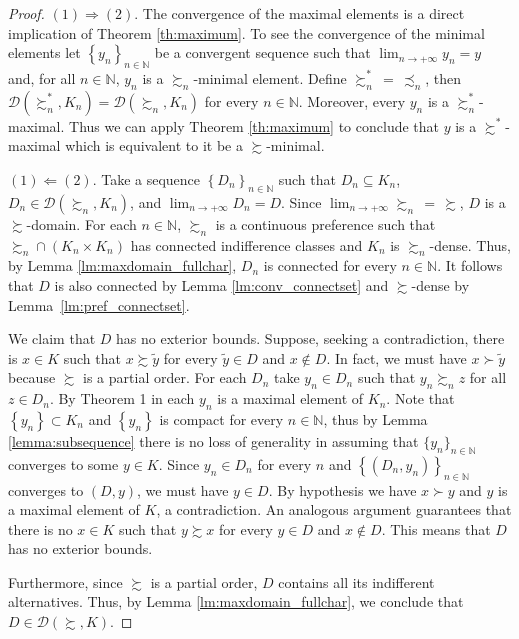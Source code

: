 \documentclass[12pt, oneside]{amsart}
\theoremstyle{definition}
\begin{document}
\begin{proof}
$(1) \Rightarrow (2)$. The convergence of the maximal elements is a direct implication of Theorem \ref{th:maximum}. To see the convergence of the minimal elements let $\left\{y_n\right\}_{n \in \mathbb{N}}$ be a convergent sequence such that $\lim_{n \to + \infty} y_n = y$ and, for all $n \in \mathbb{N}$, $y_n$ is a $\succsim_n$-minimal element. Define $\succsim^*_n \hspace{2pt} = \hspace{2pt}\precsim_n$, then $\mathcal{D}\left(\succsim^*_n, K_n\right) = \mathcal{D}\left(\succsim_n, K_n\right)$ for every $n \in \mathbb{N}$. Moreover, every $y_n$ is a $\succsim^*_n$-maximal. Thus we can apply Theorem \ref{th:maximum} to conclude that $y$ is a $\succsim^*$-maximal which is equivalent to it be a $\succsim$-minimal.
	
$(1) \Leftarrow (2)$. Take a sequence $\left\{D_n\right\}_{n \in \mathbb{N}}$ such that $D_n \subseteq K_n$, $D_n \in \mathcal{D}\left(\succsim_n, K_n\right)$, and $\lim_{n \to +\infty} D_n = D$. Since $\lim_{n \to +\infty} \succsim_n \hspace{2pt} = \hspace{2pt} \succsim$, $D$ is a $\succsim$-domain. For each $n \in \mathbb{N}$, $\succsim_n$ is a continuous preference such that $\succsim_n \cap \left(K_n \times K_n\right)$ has connected indifference classes and $K_n$ is $\succsim_n$-dense. Thus, by Lemma \ref{lm:maxdomain_fullchar}, $D_n$ is connected for every $n \in \mathbb{N}$. It follows that $D$ is also connected by Lemma \ref{lm:conv_connectset} and $\succsim$-dense by Lemma~\ref{lm:pref_connectset}.

We claim that $D$ has no exterior bounds. Suppose, seeking a contradiction, there is $x \in K$ such that $x \succsim\tilde{y}$ for every $\tilde{y} \in D$ and $x \notin D$. In fact, we must have $x \succ \tilde{y}$ because $\succsim$ is a partial order. For each $D_n$ take $y_n \in D_n$ such that $y_n \succsim_n z$ for all $z \in D_n$. By Theorem 1 in \citet*{Gorno2018} each $y_n$ is a maximal element of $K_n$. Note that $\left\{y_n\right\} \subset K_n$ and $\left\{y_n\right\}$ is compact for every $n \in \mathbb{N}$, thus by Lemma \ref{lemma:subsequence} there is no loss of generality in assuming that $\{y_n\}_{n\in \mathbb{N}}$ converges to some $y \in K$. Since $y_n \in D_n$ for every $n$ and $\left\{(D_n, y_n)\right\}_{n \in \mathbb{N}}$ converges to $(D,y)$, we must have $y \in D$. By hypothesis we have $x \succ y$ and $y$ is a maximal element of $K$, a contradiction. An analogous argument guarantees that there is no $x \in K$ such that $y \succsim x$ for every $y \in D$ and $x \notin D$. This means that $D$ has no exterior bounds.
	
Furthermore, since $\succsim$ is a partial order, $D$ contains all its indifferent alternatives. Thus, by Lemma \ref{lm:maxdomain_fullchar}, we conclude that $D \in \mathcal{D}\left(\succsim, K\right)$.
\end{proof}
\end{document}
